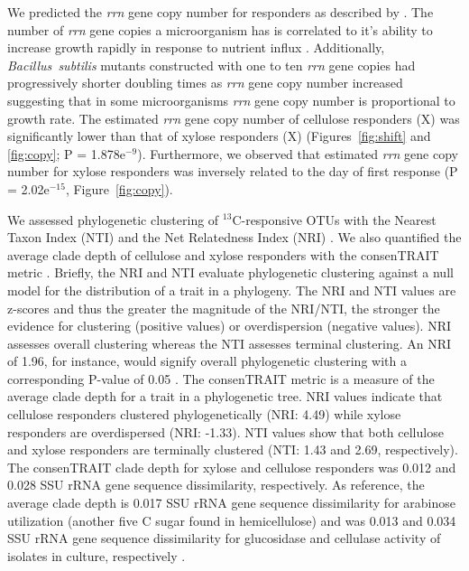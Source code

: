 We predicted the \textit{rrn} gene copy number for responders as described
by \citet{Kembel_2012}. The number of \textit{rrn} gene copies
a microorganism has is correlated to it's ability to increase growth
rapidly in response to nutrient influx \citep{Klappenbach_2000}.
Additionally, \textit{Bacillus~subtilis} mutants constructed with one to
ten \textit{rrn} gene copies had progressively shorter doubling times as
\textit{rrn} gene copy number increased \citep{yano_multiple_2013}
suggesting that in some microorganisms \textit{rrn} gene copy number is
proportional to growth rate. The estimated \textit{rrn} gene
copy number of cellulose responders (X) was significantly lower than that
of xylose responders (X) (Figures~\ref{fig:shift} and \ref{fig:copy};
P = 1.878e$^{-9}$). Furthermore, we observed that estimated \textit{rrn}
gene copy number for xylose responders was inversely related to the day of
first response (P = 2.02e$^{-15}$, Figure~\ref{fig:copy}).

We assessed phylogenetic clustering of $^{13}$C-responsive OTUs with the
Nearest Taxon Index (NTI) and the Net Relatedness Index (NRI)
\citep{Webb2000}. We also quantified the average clade depth of cellulose and
xylose responders with the consenTRAIT metric \citep{Martiny2013}. Briefly, the
NRI and NTI evaluate phylogenetic clustering against a null model for the
distribution of a trait in a phylogeny. The NRI and NTI values are z-scores and
thus the greater the magnitude of the NRI/NTI, the stronger the evidence for
clustering (positive values) or overdispersion (negative values). NRI assesses
overall clustering whereas the NTI assesses terminal clustering. An NRI of
1.96, for instance, would signify overall phylogenetic clustering with
a corresponding P-value of 0.05 \citep{Evans2014a}. The consenTRAIT metric is
a measure of the average clade depth for a trait in a phylogenetic tree. NRI
values indicate that cellulose responders clustered phylogenetically (NRI:
4.49) while xylose responders are overdispersed (NRI: -1.33). NTI values show
that both cellulose and xylose responders are terminally clustered (NTI: 1.43
and 2.69, respectively). The consenTRAIT clade depth for xylose and cellulose
responders was 0.012 and 0.028 SSU rRNA gene sequence dissimilarity,
respectively. As reference, the average clade depth is 0.017 SSU rRNA gene
sequence dissimilarity for arabinose utilization (another five C sugar found in
hemicellulose) and was 0.013 and 0.034 SSU rRNA gene sequence dissimilarity for
glucosidase and cellulase activity of isolates in culture, respectively
\citep{Martiny2013,Berlemont2013}.

